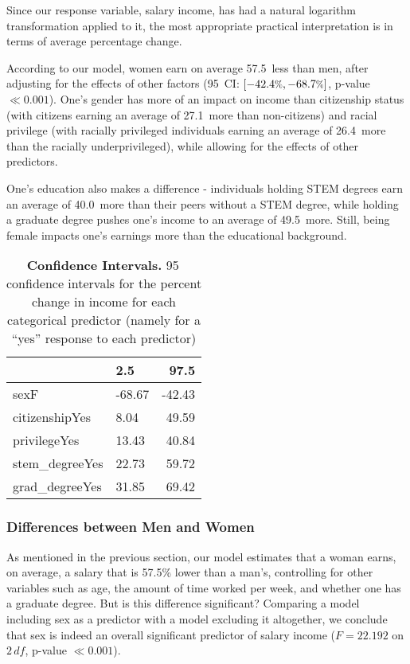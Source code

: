 \documentclass{article}
\newcommand*\pct{\scalebox{.85}{\%}}
\begin{document}
Since our response variable, salary income, has had a natural logarithm transformation applied to it, the most appropriate practical interpretation is in terms of average percentage change.

According to our model, women earn on average 57.5\pct \, less than men, after adjusting for the effects of other factors (95\pct \, CI: $\left[-42.4\pct, -68.7\pct\right]$, p-value $\ll 0.001$). One's gender has more of an impact on income than citizenship status (with citizens earning an average of 27.1\pct \, more than non-citizens) and racial privilege (with racially privileged individuals earning an average of 26.4\pct \, more than the racially underprivileged), while allowing for the effects of other predictors.

One's education also makes a difference - individuals holding STEM degrees earn an average of 40.0\pct \, more than their peers without a STEM degree, while holding a graduate degree pushes one's income to an average of 49.5\pct \, more. Still, being female impacts one's earnings more than the educational background. 

\begin{table}[ht]
\centering
\begin{tabular}{llr}
  \toprule
  & 2.5\pct & 97.5\pct \\ 
  \midrule
  sexF & -68.67 & -42.43 \\ 
  citizenshipYes & 8.04 & 49.59 \\ 
  privilegeYes & 13.43 & 40.84 \\ 
  stem\_degreeYes & 22.73 & 59.72 \\ 
  grad\_degreeYes & 31.85 & 69.42 \\ 
  \bottomrule
\end{tabular}
\caption{\textbf{Confidence Intervals.} 95\pct \, confidence intervals for the percent change in income for each categorical predictor (namely for a ``yes'' response to each predictor)}
\label{confint}
\end{table}

\subsubsection{Differences between Men and Women}

As mentioned in the previous section, our model estimates that a woman earns, on average, a salary that is 57.5\% lower than a man's, controlling for other variables such as age, the amount of time worked per week, and whether one has a graduate degree. But is this difference significant? Comparing a model including sex as a predictor with a model excluding it altogether, we conclude that sex is indeed an overall significant predictor of salary income ($F = 22.192$ on $2 \, df$, p-value $\ll 0.001$).
\end{document}
